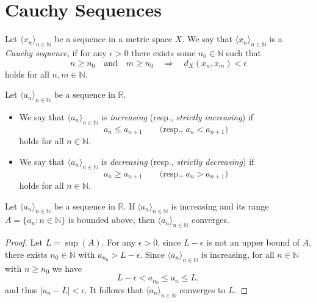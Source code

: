 \section{Cauchy Sequences}
\begin{definition}
  Let $\langle x_n \rangle_{n \in \mathbb{N}}$ be a sequence in a metric space
  $X$.
  We say that $\langle x_n \rangle_{n \in \mathbb{N}}$ is a
  \emph{Cauchy sequence}, if for any $\epsilon > 0$ there exists some
  $n_0 \in \mathbb{N}$ such that
  \begin{equation*}
    n \geq n_0
    \quad \text{and} \quad
    m \geq n_0
    \quad \Rightarrow \quad
    d_X(x_n, x_m) < \epsilon
  \end{equation*}
  holds for all $n, m \in \mathbb{N}$.
\end{definition}

\begin{definition}
  Let $\langle a_n \rangle_{n \in \mathbb{N}}$ be a sequence in $\mathbb{R}$.
  \begin{itemize}
    \item We say that $\langle a_n \rangle_{n \in \mathbb{N}}$ is
    \emph{increasing} (resp., \emph{strictly increasing}) if
    \begin{equation*}
      a_n \leq a_{n+1}
      \qquad
      \text{(resp., $a_n < a_{n+1}$)}
    \end{equation*}
    holds for all $n \in \mathbb{N}$.
    \item We say that $\langle a_n \rangle_{n \in \mathbb{N}}$ is
    \emph{decreasing} (resp., \emph{strictly decreasing}) if
    \begin{equation*}
      a_n \geq a_{n+1}
      \qquad
      \text{(resp., $a_n > a_{n+1}$)}
    \end{equation*}
    holds for all $n \in \mathbb{N}$.
  \end{itemize}
\end{definition}

\begin{theorem}
  Let $\langle a_n \rangle_{n \in \mathbb{N}}$ be a sequence in $\mathbb{R}$.
  If $\langle a_n \rangle_{n \in \mathbb{N}}$ is increasing and its range
  $A = \{a_n: n \in \mathbb{N}\}$ is bounded above, then
  $\langle a_n \rangle_{n \in \mathbb{N}}$ converges.
\end{theorem}
\begin{proof}
  Let $L = \sup(A)$.
  For any $\epsilon > 0$, since $L - \epsilon$ is not an upper bound of $A$,
  there exists $n_0 \in \mathbb{N}$ with $a_{n_0} > L - \epsilon$.
  Since $\langle a_n \rangle_{n \in \mathbb{N}}$ is increasing, for all
  $n \in \mathbb{N}$ with $n \geq n_0$ we have
  \begin{equation*}
    L - \epsilon < a_{n_0} \leq a_n \leq L,
  \end{equation*}
  and thus $|a_n - L| < \epsilon$.
  It follows that $\langle a_n \rangle_{n \in \mathbb{N}}$ converges to $L$.
\end{proof}
